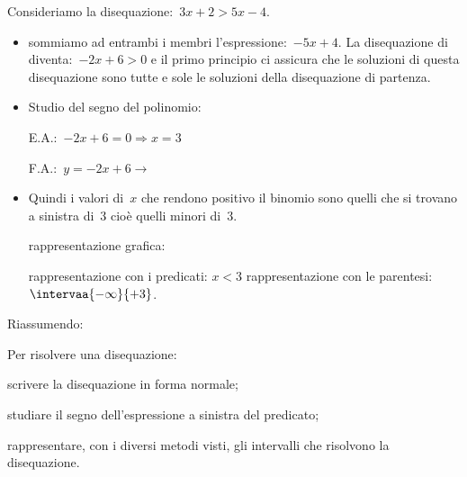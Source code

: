  \begin{esempio}{}{}
Consideriamo la disequazione:~\(3x + 2 > 5 x -4\).
\begin{itemize} [noitemsep]
 \item sommiamo ad entrambi i membri l'espressione:~\(-5 x +4\). 
La disequazione di diventa:~\(-2 x +6 > 0\) e il primo principio ci assicura 
che le soluzioni di questa disequazione sono tutte e sole le soluzioni della 
disequazione di partenza.

 \item Studio del segno del polinomio: \\
 \begin{minipage}{.45\textwidth}
  E.A.:~\(-2 x +6=0 \Rightarrow  x=3\)
 \end{minipage}
 \begin{minipage}{.25\textwidth}
  F.A.:~\(y=-2 x +6 \rightarrow \)
 \end{minipage}
 \begin{minipage}{.3\textwidth}
%   
 \end{minipage}
 \item Quindi i valori di~\(x\) che rendono positivo il binomio sono quelli 
 che si trovano a sinistra di~3 cioè quelli minori di~3. 
 \subitem 
  \begin{minipage}{.35\textwidth}
   rappresentazione grafica: 
  \end{minipage}
  \begin{minipage}{.30\textwidth}
%    
  \end{minipage}
 \subitem rappresentazione con i predicati: \quad \(x < 3\) 
 \subitem rappresentazione con le parentesi: 
\quad \(\intervaa{-\infty}{+3}\). 
\end{itemize}
 \end{esempio}

Riassumendo:

\begin{procedura}{}{}
 Per risolvere una disequazione:
\begin{enumeratea}
 \item scrivere la disequazione in forma normale;
 \item studiare il segno dell'espressione a sinistra del predicato;
 \item rappresentare, con i diversi metodi visti, 
  gli intervalli che risolvono la disequazione.
\end{enumeratea}
\end{procedura}

